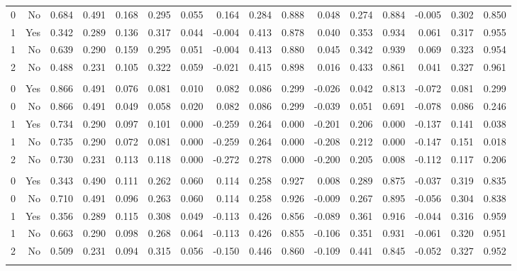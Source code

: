 \begin{tabular}{*{16}{r}}
0 & No & 0.684 & 0.491 & 0.168 & 0.295 & 0.055 & 0.164 & 0.284 & 0.888 & 0.048 & 0.274 & 0.884 & -0.005 & 0.302 & 0.850 \\ 
1 & Yes & 0.342 & 0.289 & 0.136 & 0.317 & 0.044 & -0.004 & 0.413 & 0.878 & 0.040 & 0.353 & 0.934 & 0.061 & 0.317 & 0.955 \\ 
1 & No & 0.639 & 0.290 & 0.159 & 0.295 & 0.051 & -0.004 & 0.413 & 0.880 & 0.045 & 0.342 & 0.939 & 0.069 & 0.323 & 0.954 \\ 
2 & No & 0.488 & 0.231 & 0.105 & 0.322 & 0.059 & -0.021 & 0.415 & 0.898 & 0.016 & 0.433 & 0.861 & 0.041 & 0.327 & 0.961 \\ 
\addlinespace 
 \multicolumn{16}{l}{\textbf{4. Complex f}} \\ 
0 & Yes & 0.866 & 0.491 & 0.076 & 0.081 & 0.010 & 0.082 & 0.086 & 0.299 & -0.026 & 0.042 & 0.813 & -0.072 & 0.081 & 0.299 \\ 
0 & No & 0.866 & 0.491 & 0.049 & 0.058 & 0.020 & 0.082 & 0.086 & 0.299 & -0.039 & 0.051 & 0.691 & -0.078 & 0.086 & 0.246 \\ 
1 & Yes & 0.734 & 0.290 & 0.097 & 0.101 & 0.000 & -0.259 & 0.264 & 0.000 & -0.201 & 0.206 & 0.000 & -0.137 & 0.141 & 0.038 \\ 
1 & No & 0.735 & 0.290 & 0.072 & 0.081 & 0.000 & -0.259 & 0.264 & 0.000 & -0.208 & 0.212 & 0.000 & -0.147 & 0.151 & 0.018 \\ 
2 & No & 0.730 & 0.231 & 0.113 & 0.118 & 0.000 & -0.272 & 0.278 & 0.000 & -0.200 & 0.205 & 0.008 & -0.112 & 0.117 & 0.206 \\ 
\addlinespace 
 \multicolumn{16}{l}{\textbf{5. Complex f with linear confound.}} \\ 
0 & Yes & 0.343 & 0.490 & 0.111 & 0.262 & 0.060 & 0.114 & 0.258 & 0.927 & 0.008 & 0.289 & 0.875 & -0.037 & 0.319 & 0.835 \\ 
0 & No & 0.710 & 0.491 & 0.096 & 0.263 & 0.060 & 0.114 & 0.258 & 0.926 & -0.009 & 0.267 & 0.895 & -0.056 & 0.304 & 0.838 \\ 
1 & Yes & 0.356 & 0.289 & 0.115 & 0.308 & 0.049 & -0.113 & 0.426 & 0.856 & -0.089 & 0.361 & 0.916 & -0.044 & 0.316 & 0.959 \\ 
1 & No & 0.663 & 0.290 & 0.098 & 0.268 & 0.064 & -0.113 & 0.426 & 0.855 & -0.106 & 0.351 & 0.931 & -0.061 & 0.320 & 0.951 \\ 
2 & No & 0.509 & 0.231 & 0.094 & 0.315 & 0.056 & -0.150 & 0.446 & 0.860 & -0.109 & 0.441 & 0.845 & -0.052 & 0.327 & 0.952 \\ 
\addlinespace 
 \multicolumn{16}{l}{\textbf{6. Complex f with linear and non-linear confound.}} \\ 

\end{tabular}
